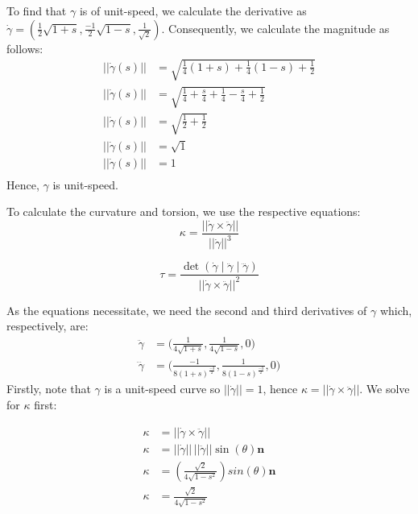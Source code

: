 \documentclass{article}
\begin{document}
    \begin{flushleft}
        To find that $\gamma$ is of unit-speed, we calculate the derivative as $\dot{\gamma} = (\frac{1}{2}\sqrt{1 + s}, \frac{-1}{2}\sqrt{1-s}, \frac{1}{\sqrt{2}})$. Consequently, we calculate the magnitude as follows: 
        \begin{align*}
            ||\dot{\gamma}(s)|| &= \sqrt{\frac{1}{4}(1+s) + \frac{1}{4}(1-s) + \frac{1}{2}} \\ 
            ||\dot{\gamma}(s)|| &= \sqrt{\frac{1}{4} + \frac{s}{4} + \frac{1}{4} - \frac{s}{4} + \frac{1}{2}} \\ 
            ||\dot{\gamma}(s)|| &= \sqrt{\frac{1}{2} + \frac{1}{2}} \\ 
            ||\dot{\gamma}(s)|| &= \sqrt{1} \\ 
            ||\dot{\gamma}(s)|| &= 1 \\ 
        \end{align*}
        Hence, $\gamma$ is unit-speed. \newline

        To calculate the curvature and torsion, we use the respective equations:
        \begin{equation*}
            \kappa = \frac{||\dot{\gamma} \times \ddot{\gamma}||}{||\dot{\gamma}||^3}
        \end{equation*}
        
        \begin{equation*}
                \tau = \frac{\det({\dot{\gamma}} \mid \ddot{\gamma} \mid \dddot{\gamma})}{||\dot{\gamma} \times \ddot{\gamma}||^2}
        \end{equation*}

        As the equations necessitate, we need the second and third derivatives of $\gamma$ which, respectively, are:
        \begin{align*}
            \ddot{\gamma} &= \biggl(\frac{1}{4\sqrt{1+s}}, \frac{1}{4\sqrt{1-s}}, 0\biggl) \\ 
            \dddot{\gamma} &= \biggl(\frac{-1}{8(1+s)^{\frac{-3}{2}}}, \frac{1}{8(1-s)^{\frac{-3}{2}}}, 0\biggl)
        \end{align*}
        Firstly, note that $\gamma$ is a unit-speed curve so $||\dot{\gamma}|| = 1$, hence $\kappa = ||\dot{\gamma} \times \ddot{\gamma}||$. We solve for $\kappa$ first: 

        \begin{align*}
            \kappa &= ||\dot{\gamma} \times \ddot{\gamma}|| \\ 
            \kappa &= ||\dot{\gamma}|| \, ||\ddot{\gamma}|| \sin(\theta)\mathbf{n} \\ 
            \kappa &= (\frac{\sqrt{2}}{4\sqrt{1-s^2}})sin(\theta)\mathbf{n} \\ 
            \kappa &= \frac{\sqrt{2}}{4\sqrt{1-s^2}}
        \end{align*}
    \end{flushleft}
\end{document}
